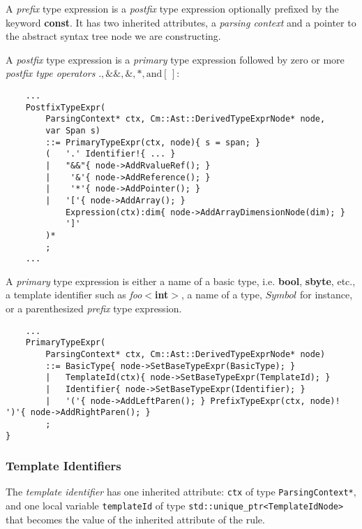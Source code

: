 \documentclass[a4paper,oneside,11pt]{book}
\theoremstyle{definition}
\begin{document}
\begin{flushleft}
A \emph{prefix} type expression is a \emph{postfix} type expression optionally prefixed by the keyword \textbf{const}.
It has two inherited attributes, a \emph{parsing context} and a pointer to the abstract syntax tree node we are constructing.
\end{flushleft}

\begin{flushleft}
A \emph{postfix} type expression is a \emph{primary} type expression followed by zero or more
\emph{postfix type operators} $., \&\&, \&, *, \textrm{and} [\,]$:
\end{flushleft}

\lstset{language=cmpg}
\begin{lstlisting}
    ...
    PostfixTypeExpr(
        ParsingContext* ctx, Cm::Ast::DerivedTypeExprNode* node,
        var Span s)
        ::= PrimaryTypeExpr(ctx, node){ s = span; }
        (   '.' Identifier!{ ... }
        |   "&&"{ node->AddRvalueRef(); }
        |    '&'{ node->AddReference(); }
        |    '*'{ node->AddPointer(); }
        |   '['{ node->AddArray(); }
            Expression(ctx):dim{ node->AddArrayDimensionNode(dim); }
            ']'
        )*
        ;
    ...
\end{lstlisting}

\begin{flushleft}
A \emph{primary} type expression is either a name of a basic type, i.e. \textbf{bool}, \textbf{sbyte}, etc.,
a template identifier such as \emph{foo}$<$\textbf{int}$>$, a name of a type, $Symbol$ for instance,
or a parenthesized \emph{prefix} type expression.
\end{flushleft}

\lstset{language=cmpg}
\begin{lstlisting}
    ...
    PrimaryTypeExpr(
        ParsingContext* ctx, Cm::Ast::DerivedTypeExprNode* node)
        ::= BasicType{ node->SetBaseTypeExpr(BasicType); }
        |   TemplateId(ctx){ node->SetBaseTypeExpr(TemplateId); }
        |   Identifier{ node->SetBaseTypeExpr(Identifier); }
        |   '('{ node->AddLeftParen(); } PrefixTypeExpr(ctx, node)! ')'{ node->AddRightParen(); }
        ;
}
\end{lstlisting}

\subsubsection{Template Identifiers}

The \emph{template identifier} has one inherited attribute:
\verb|ctx| of type \verb|ParsingContext*|,
and one local variable \verb|templateId| of type
\verb|std::unique_ptr<TemplateIdNode>| that
becomes the value of the inherited attribute of the rule.
\end{document}
